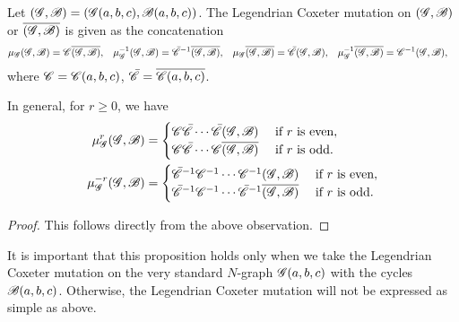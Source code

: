 \begin{proposition}\label{proposition:effect of Legendrian Coxeter mutation}
Let $(\mathscr{G}, \mathscr{B}) = (\mathscr{G}(a,b,c), \mathscr{B}(a,b,c))$.
The Legendrian Coxeter mutation on $(\mathscr{G}, \mathscr{B})$ or $\overline{(\mathscr{G},\mathscr{B})}$ is given as the concatenation
\begin{align*}
\mu_\mathscr{G}(\mathscr{G}, \mathscr{B}) &= \mathscr{C}\overline{(\mathscr{G},\mathscr{B})},&
\mu_\mathscr{G}^{-1}(\mathscr{G}, \mathscr{B}) &= \bar{\mathscr{C}}^{-1}\overline{(\mathscr{G},\mathscr{B})},&
\mu_\mathscr{G}\overline{(\mathscr{G},\mathscr{B})} &= \bar {\mathscr{C}} (\mathscr{G}, \mathscr{B}),&
\mu_\mathscr{G}^{-1}\overline{(\mathscr{G},\mathscr{B})} &= \mathscr{C}^{-1} (\mathscr{G}, \mathscr{B}),
\end{align*}
where $\mathscr{C}=\mathscr{C}(a,b,c)$, $\bar{\mathscr{C}}=\overline{\mathscr{C}(a,b,c)}$.

In general, for $r\ge 0$, we have
\begin{align*}
\mu_\mathscr{G}^r(\mathscr{G},\mathscr{B}) &= \begin{cases}
\mathscr{C}\bar{\mathscr{C}}\cdots \bar{\mathscr{C}} (\mathscr{G},\mathscr{B})& \text{ if }r\text{ is even},\\
\mathscr{C}\bar{\mathscr{C}}\cdots \mathscr{C} \overline{(\mathscr{G},\mathscr{B})}& \text{ if }r\text{ is odd}.
\end{cases}\\
\mu_\mathscr{G}^{-r}(\mathscr{G},\mathscr{B}) &= \begin{cases}
\bar{\mathscr{C}}^{-1}\mathscr{C}^{-1}\cdots \mathscr{C}^{-1} (\mathscr{G},\mathscr{B})& \text{ if }r\text{ is even},\\
\bar{\mathscr{C}}^{-1}\mathscr{C}^{-1}\cdots \bar{\mathscr{C}}^{-1} \overline{(\mathscr{G},\mathscr{B})}& \text{ if }r\text{ is odd}.
\end{cases}
\end{align*}
\end{proposition}
\begin{proof}
This follows directly from the above observation.
\end{proof}

It is important that this proposition holds only when we take the Legendrian Coxeter mutation on the very standard $N$-graph $\mathscr{G}(a,b,c)$ with the cycles $\mathscr{B}(a,b,c)$.
Otherwise, the Legendrian Coxeter mutation will not be expressed as simple as above.


